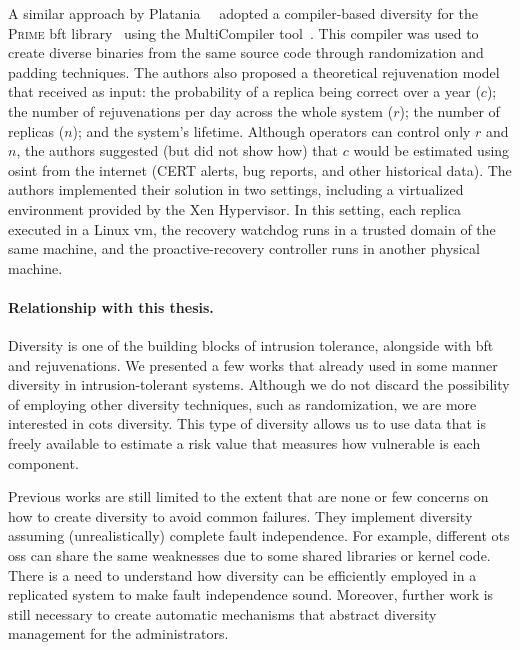 A similar approach by Platania~\etal{}~\cite{Platania:2014} adopted a compiler-based diversity for the \textsc{Prime} \gls{bft} library~\cite{Amir:2011} using the MultiCompiler tool~\cite{Homescu:2013}.
This compiler was used to create diverse binaries from the same source code through randomization and padding techniques.
The authors also proposed a theoretical rejuvenation model that received as input: the probability of a replica being correct over a year ($c$); the number of rejuvenations per day across the whole system ($r$); the number of replicas ($n$); and the system's lifetime. 
Although operators can control only $r$ and $n$, the authors suggested (but did not show how) that $c$ would be estimated using \gls{osint} from the internet (CERT alerts, bug reports, and other historical data).
The authors implemented their solution in two settings, including a virtualized environment provided by the Xen Hypervisor.
In this setting, each replica executed in a Linux \gls{vm}, the recovery watchdog runs in a trusted domain of the same machine, and the proactive-recovery controller runs in another physical machine.


\paragraph{Relationship with this thesis.} 
Diversity is one of the building blocks of intrusion tolerance, alongside with \gls{bft} and rejuvenations. 
We presented a few works that already used in some manner diversity in intrusion-tolerant systems. 
Although we do not discard the possibility of employing other diversity techniques, such as randomization, we are more interested in \gls{cots} diversity.
This type of diversity allows us to use data that is freely available to estimate a risk value that measures how vulnerable is each component. 

Previous works are still limited to the extent that are none or few concerns on how to create diversity to avoid common failures. 
They implement diversity assuming (unrealistically) complete fault independence. 
For example, different \gls{ots} \glspl{os} can share the same weaknesses due to some shared libraries or kernel code. 
There is a need to understand how diversity can be efficiently employed in a replicated system to make fault independence sound. 
Moreover, further work is still necessary to create automatic mechanisms that abstract diversity management for the administrators.




